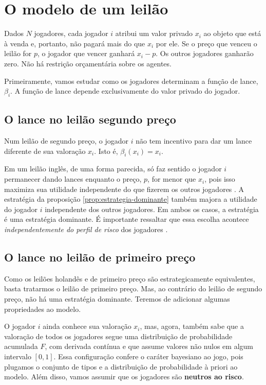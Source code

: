 \section{O modelo de um leilão}

Dados $N$ jogadores, cada jogador $i$ atribui um valor privado $x_i$ ao objeto que está à venda e, portanto, não pagará mais do que $x_i$ por ele. Se o preço que venceu o leilão for $p$, o jogador que vencer ganhará $x_i - p$. Os outros jogadores ganharão zero. Não há restrição orçamentária sobre os agentes.

Primeiramente, vamos estudar como os jogadores determinam a função de lance, $\beta_i$. A função de lance depende exclusivamente do valor privado do jogador.

\subsection{O lance no leilão segundo preço}

\begin{proposicao}
    \label{prop:estrategia-dominante}
    Num leilão de segundo preço, o jogador $i$ não tem incentivo para dar um lance diferente de sua valoração $x_i$. Isto é, $\beta_{i}(x_i) = x_i$.
\end{proposicao}

Em um leilão inglês, de uma forma parecida, só faz sentido o jogador $i$ permanecer dando lances enquanto o preço, $p$, for menor que $x_i$, pois isso maximiza sua utilidade independente do que fizerem os outros jogadores \citet{karlin2017game}. A estratégia da proposição \ref{prop:estrategia-dominante} também majora a utilidade do jogador $i$ independente dos outros jogadores. Em ambos os casos, a estratégia é uma estratégia dominante. É importante ressaltar que essa escolha acontece \emph{independentemente do perfil de risco} dos jogadores \citet{Shoham2008}.

\subsection{O lance no leilão de primeiro preço}

Como os leilões holandês e de primeiro preço são estrategicamente equivalentes, basta tratarmos o leilão de primeiro preço. Mas, ao contrário do leilão de segundo preço, não há uma estratégia dominante. Teremos de adicionar algumas propriedades ao modelo.

O jogador $i$ ainda conhece sua valoração $x_i$, mas, agora, também sabe que a valoração de todos os jogadores segue uma distribuição de probabilidade acumulada $F$, com derivada contínua e que assume valores não nulos em algum intervalo $[0, 1]$. Essa configuração confere o caráter bayesiano ao jogo, pois plugamos o conjunto de tipos e a distribuição de probabilidade à priori ao modelo. Além disso, vamos assumir que os jogadores são \textbf{neutros ao risco}.

